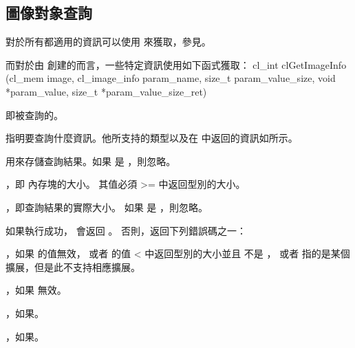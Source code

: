 \subsection{圖像對象查詢}

對於所有都適用的資訊可以使用  來獲取，參見。

而對於由  創建的而言，一些特定資訊使用如下函式獲取：
\startCLFUNC
cl_int clGetImageInfo (cl_mem image,
			cl_image_info param_name,
			size_t param_value_size,
			void *param_value,
			size_t *param_value_size_ret)
\stopCLFUNC

 即被查詢的。

 指明要查詢什麼資訊。他所支持的類型以及在  中返回的資訊如所示。

 用來存儲查詢結果。如果  是 ，則忽略。

，即  內存塊的大小。
其值必須 >= 中返回型別的大小。

，即查詢結果的實際大小。
如果  是 ，則忽略。

如果執行成功，  會返回 。
否則，返回下列錯誤碼之一：
\startigBase
\item {}，如果  的值無效，
或者  的值 < 中返回型別的大小並且  不是 ，
或者  指的是某個擴展，但是此不支持相應擴展。

\item {}，如果  無效。

\item {}，如果\scdevfailres。
\item {}，如果\schostfailres。
\stopigBase

{}

